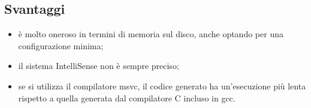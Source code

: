 \subsection*{Svantaggi}
\begin{itemize}
	\item è molto oneroso in termini di memoria sul disco, anche optando per una configurazione minima;
	\item il sistema IntelliSense non è sempre preciso;
	\item se si utilizza il compilatore \gls{msvc}, il codice generato ha un'esecuzione più lenta rispetto a quella generata dal compilatore C incluso in \gls{gcc}.
\end{itemize}



 
